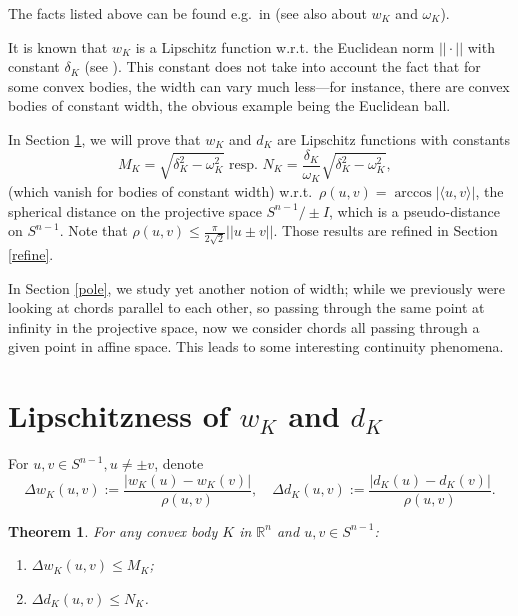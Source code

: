 \documentclass[a4paper,12pt]{amsart}
\newtheorem{thm}{Theorem}
\def\R{\mathbb R}
\def\om{\omega}
\def\d{\delta}
\begin{document}
The facts listed above  can be found e.g.~in \cite{Sol} (see also \cite{MW} about $w_K$ and $\om_K$).
\smallskip

It is known that $w_K$ is a Lipschitz function w.r.t. the Euclidean
norm $||\cdot||$ with constant $\d_K$ (see
\cite[Proposition]{MW}). This constant does not take into account
the fact that for some convex bodies, the width can
vary much less---for instance, there are convex bodies
of constant width, the obvious example being
the Euclidean ball.

In Section \ref{lipcst}, we will prove that $w_K$  and $d_K$ are
Lipschitz functions with constants
$$M_K=\sqrt{\d_K^2-\om_K^2}\mbox{\ \ resp.\ \ }N_K=\frac{\d_K}{\om_K}\sqrt{\d_K^2-\om_K^2},\mbox{\ }$$
(which vanish for bodies of constant width)
w.r.t.~$\rho(u,v)=\arccos|\langle u, v\rangle|$,
the spherical distance on the projective space  $S^{n-1}/\pm I$, which is a pseudo-distance on $S^{n-1}$. Note that $\rho(u,v)\le\frac{\pi}{2\sqrt2}||u\pm v||.$
Those results are refined in Section   \ref{refine}.

In Section \ref{pole}, we study yet another notion of width;
while we previously were looking at chords
parallel to each other, so passing through the same point at
infinity in the projective space, now we consider chords all
passing through a given  point in affine space.
This leads to some interesting continuity phenomena.

\section{Lipschitzness of $w_K$ and $d_K$}
\label{lipcst}


For $u,v \in S^{n-1}, u\neq \pm v $, denote
\[
\Delta w_K(u,v) := \frac{|w_K(u)-w_K(v)|}{\rho(u,v)}, \quad
\Delta d_K(u,v) := \frac{|d_K(u)-d_K(v)|}{\rho(u,v)}.
\]

\begin{thm}
\label{main} For any convex body $K$ in $\R^n$ and $u, v\in
S^{n-1}$:
\begin{enumerate}
\item $\Delta w_K(u,v)\le M_K$;
\item $\Delta d_K(u,v)\le N_K$.
\end{enumerate}
\end{thm}
\end{document}
